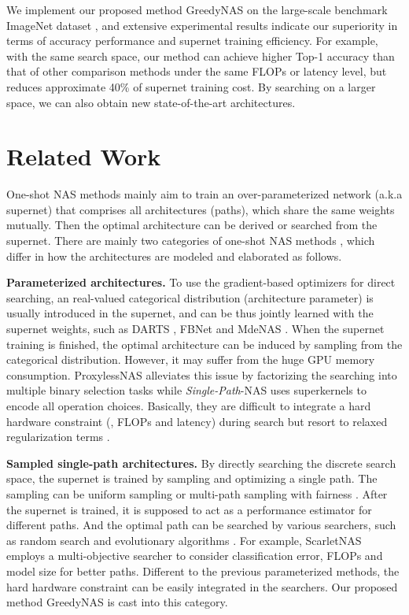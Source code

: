 \documentclass[10pt,twocolumn,letterpaper]{article}
\begin{document}
We implement our proposed method GreedyNAS on the large-scale benchmark ImageNet dataset \cite{imagenet}, and extensive experimental results indicate our superiority in terms of accuracy performance and supernet training efficiency. For example, with the same search space, our method can achieve higher Top-1 accuracy than that of other comparison methods under the same FLOPs or latency level, but reduces approximate 40\% of supernet training cost. By searching on a larger space, we can also obtain new state-of-the-art architectures. 







\section{Related Work}
One-shot NAS methods mainly aim to train an over-parameterized network (a.k.a supernet) that comprises all architectures (paths), which share the same weights mutually. Then the optimal architecture can be derived or searched from the supernet. There are mainly two categories of one-shot NAS methods \cite{elsken2019neural}, which differ in how the architectures are modeled and elaborated as follows.

\textbf{Parameterized architectures.} To use the gradient-based optimizers for direct searching, an real-valued categorical distribution (architecture parameter) is usually introduced in the supernet, and can be thus jointly learned with the supernet weights, such as DARTS \cite{darts}, FBNet \cite{fbnet} and MdeNAS \cite{mdenas}. When the supernet training is finished, the optimal architecture can be induced by sampling from the categorical distribution. However, it may suffer from the huge GPU memory consumption. ProxylessNAS \cite{proxylessnas} alleviates this issue by factorizing the searching into multiple binary selection tasks while \textit{Single-Path}-NAS \cite{singlepathnas} uses superkernels to encode all operation choices. Basically, they are difficult to integrate a hard hardware constraint (\eg, FLOPs and latency) during search but resort to relaxed regularization terms \cite{fbnet,proxylessnas}. 

\textbf{Sampled single-path architectures.} By directly searching the discrete search space, the supernet is trained by sampling and optimizing a single path. The sampling can be uniform sampling \cite{face++,random} or multi-path sampling with fairness \cite{fairnas}. After the supernet is trained, it is supposed to act as a performance estimator for different paths. And the optimal path can be searched by various searchers, such as random search and evolutionary algorithms \cite{deb2002fast}. For example, ScarletNAS \cite{scarletnas} employs a multi-objective searcher \cite{lu2018nsga} to consider classification error, FLOPs and model size for better paths. Different to the previous parameterized methods, the hard hardware constraint can be easily integrated in the searchers. Our proposed method GreedyNAS is cast into this category. 
\end{document}
